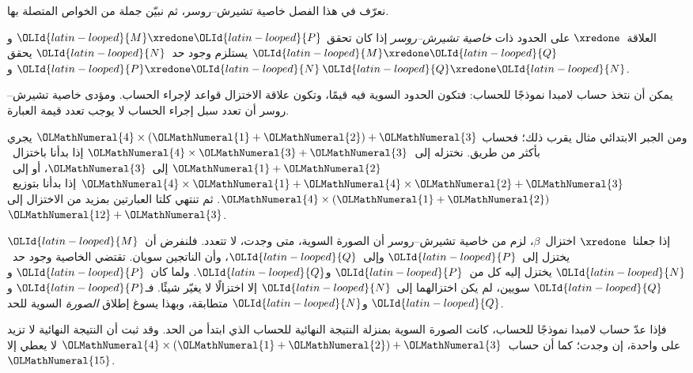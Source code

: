 \documentclass[../../../include/open-logic-section]{subfiles}
\begin{document}


نعرّف في هذا الفصل خاصية تشيرش--روسر، ثم نبيّن جملة من الخواص المتصلة بها.

\begin{defn} العلاقة~$\xredone$ على الحدود
  ذات \emph{خاصية تشيرش--روسر} إذا كان تحقق
  $\OLId{latin-looped}{M} \xredone \OLId{latin-looped}{P}$ و$\OLId{latin-looped}{M} \xredone \OLId{latin-looped}{Q}$ يستلزم وجود حد~$\OLId{latin-looped}{N}$ يحقق
  $\OLId{latin-looped}{P} \xredone \OLId{latin-looped}{N}$ و$\OLId{latin-looped}{Q} \xredone \OLId{latin-looped}{N}$.
\end{defn}

يمكن أن نتخذ حساب لامبدا نموذجًا للحساب: فتكون الحدود السوية فيه قيمًا،
وتكون علاقة الاختزال قواعد لإجراء الحساب.
ومؤدى خاصية تشيرش--روسر أن تعدد سبل إجراء الحساب لا يوجب تعدد قيمة العبارة.

ومن الجبر الابتدائي مثال يقرب ذلك؛ فحساب
$\OLMathNumeral{4} \times (\OLMathNumeral{1}+\OLMathNumeral{2}) + \OLMathNumeral{3}$ يجري بأكثر من طريق.
نختزله إلى~$\OLMathNumeral{4} \times \OLMathNumeral{3}+\OLMathNumeral{3}$ إذا بدأنا باختزال~$\OLMathNumeral{1}+\OLMathNumeral{2}$ إلى~$\OLMathNumeral{3}$،
أو إلى~$\OLMathNumeral{4} \times \OLMathNumeral{1}+\OLMathNumeral{4} \times \OLMathNumeral{2}+\OLMathNumeral{3}$ إذا بدأنا بتوزيع~$\OLMathNumeral{4} \times (\OLMathNumeral{1}+\OLMathNumeral{2})$.
ثم تنتهي كلتا العبارتين بمزيد من الاختزال إلى~$\OLMathNumeral{12}+\OLMathNumeral{3}$.

إذا جعلنا~$\xredone$ اختزال~$\beta$، لزم من خاصية تشيرش--روسر أن الصورة السوية،
متى وجدت، لا تتعدد. فلنفرض أن~$\OLId{latin-looped}{M}$ يختزل إلى~$\OLId{latin-looped}{P}$ وإلى~$\OLId{latin-looped}{Q}$،
وأن الناتجين سويان. تقتضي الخاصية وجود حد~$\OLId{latin-looped}{N}$ يختزل إليه كل من~$\OLId{latin-looped}{P}$ و$\OLId{latin-looped}{Q}$.
ولما كان~$\OLId{latin-looped}{P}$ و$\OLId{latin-looped}{Q}$ سويين، لم يكن اختزالهما إلى~$\OLId{latin-looped}{N}$ إلا اختزالًا لا يغيّر شيئًا.
فـ$\OLId{latin-looped}{P}$ و$\OLId{latin-looped}{Q}$ و$\OLId{latin-looped}{N}$ متطابقة، وبهذا يسوغ إطلاق \emph{الصورة} السوية للحد.

فإذا عدّ حساب لامبدا نموذجًا للحساب، كانت الصورة السوية بمنزلة النتيجة النهائية
للحساب الذي ابتدأ من الحد. وقد ثبت أن النتيجة النهائية لا تزيد على واحدة،
إن وجدت؛ كما أن حساب~$\OLMathNumeral{4} \times (\OLMathNumeral{1}+\OLMathNumeral{2})+\OLMathNumeral{3}$ لا يعطي إلا~$\OLMathNumeral{15}$.
\end{document}
